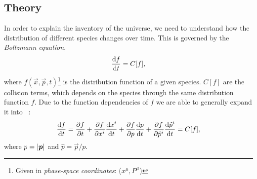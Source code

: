 \subsection{Theory}\label{sec:m2:theory}
    In order to explain the inventory of the universe, we need to understand how the distribution of different species changes over time. This is governed by the \textit{Boltzmann equation},
    \begin{equation}\label{eq:m2:theory:bolzmann_def}
        \dv{f}{t} = C[f],
    \end{equation}
    where $f(\vec{x},\vec{p},t)$\footnote{Given in \textit{phase-space coordinates}: ($x^\mu,P^\mu$)} is the distribution function of a given species. $C[f]$ are the collision terms, which depends on the species through the same distribution function $f$. Due to the function dependencies of $f$ we are able to generally expand it into ~\cite[Eq. 3.33]{dodelson2020modern}:
    \begin{equation}\label{eq:m2:theory:bolzmann_expanded}
        \dv{f}{t} = \pdv{f}{t}+\pdv{f}{x^i}\dv{x^i}{t} + \pdv{f}{p}\dv{p}{t} + \pdv{f}{\hat{p}^i}\dv{\hat{p}^i}{t} = C[f],
    \end{equation}
    where $p=\abs{\boldsymbol{p}}$ and $\hat{p}=\vec{p}/p$.

